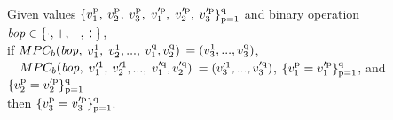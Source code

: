 \begin{axiom}[$\MPC{b}$]%
\label{axiom: mpc b ni}
Given values $\{v^{\mathrm{{p}}}_{1},$ $v^{\mathrm{{p}}}_{2},$ $v^{\mathrm{{p}}}_{3},$ $v'^{\mathrm{{p}}}_{1},$ $v'^{\mathrm{{p}}}_{2},$ $v'^{\mathrm{{p}}}_{3}\}^{\mathrm{{q}}}_{\mathrm{{p}}=\mathrm{{1}}}$ and binary operation $\mathit{bop}\in\{\cdot, +, -, \div\}$, 
\\
if $MPC_{b}(\mathit{bop},$ $v^{\mathrm{{1}}}_{1},$ $v^{\mathrm{{1}}}_{2}, ...,$ $v^{\mathrm{{q}}}_{1}, v^{\mathrm{{q}}}_{2})$ $= (v^{\mathrm{{1}}}_{3}, ..., v^{\mathrm{{q}}}_{3})$, 
\\ \-\ \-\ 
$MPC_{b}(\mathit{bop},$ $v'^{\mathrm{{1}}}_{1},$ $v'^{\mathrm{{1}}}_{2}, ...,$ $v'^{\mathrm{{q}}}_{1}, v'^{\mathrm{{q}}}_{2})$ $= (v'^{\mathrm{{1}}}_{3}, ..., v'^{\mathrm{{q}}}_{3})$,  
$\{v^{\mathrm{{p}}}_{1} = v'^{\mathrm{{p}}}_{1}\}^{\mathrm{{q}}}_{\mathrm{{p}}=\mathrm{{1}}}$, 
and $\{v^{\mathrm{{p}}}_{2} = v'^{\mathrm{{p}}}_{2}\}^{\mathrm{{q}}}_{\mathrm{{p}}=\mathrm{{1}}}$
\\
then $\{v^{\mathrm{{p}}}_{3} = v'^{\mathrm{{p}}}_{3}\}^{\mathrm{{q}}}_{\mathrm{{p}}=\mathrm{{1}}}$. 
\end{axiom}





